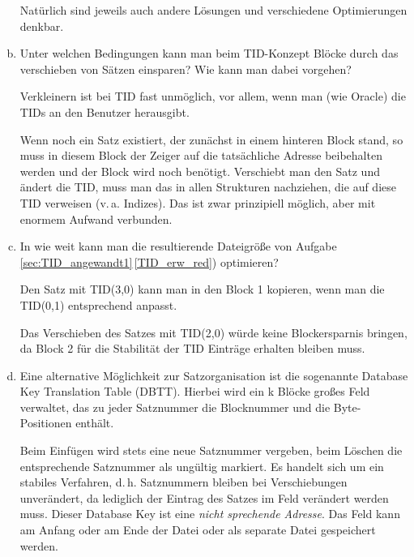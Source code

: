 \begin{enumerate}[a)]
	\begin{note}
	Natürlich sind jeweils auch andere Lösungen und verschiedene Optimierungen denkbar.
	\end{note}


	\item Unter welchen Bedingungen kann man beim TID-Konzept Blöcke durch das verschieben von Sätzen einsparen? Wie kann man dabei vorgehen?
	\label{TID_Zusammenfassen}

	\begin{solution}
	Verkleinern ist bei TID fast unmöglich, vor allem, wenn man (wie Oracle) die TIDs an den Benutzer herausgibt.

	Wenn noch ein Satz existiert, der zunächst in einem hinteren Block stand, so muss in diesem Block der Zeiger auf die tatsächliche Adresse beibehalten werden und der Block wird noch benötigt.
	Verschiebt man den Satz und ändert die TID, muss man das in allen Strukturen nachziehen, die auf diese TID verweisen (v.\,a. Indizes).
	Das ist zwar prinzipiell möglich, aber mit enormem Aufwand verbunden.
	\end{solution}

  \item In \deepen wie weit kann man die resultierende Dateigröße von Aufgabe \ref{sec:TID_angewandt1}\,\ref{TID_erw_red}) optimieren?

	\begin{note}
		Den Satz mit TID(3,0) kann man in den Block 1 kopieren, wenn man die TID(0,1) entsprechend anpasst.

		Das Verschieben des Satzes mit TID(2,0) würde keine Blockersparnis bringen, da Block 2 für die Stabilität der TID Einträge erhalten bleiben muss.
	\end{note}


	\item Eine alternative Möglichkeit zur Satzorganisation ist die sogenannte Database Key Translation Table (DBTT).
	Hierbei wird ein k Blöcke großes Feld verwaltet, das zu jeder Satznummer die Blocknummer und die Byte-Positionen enthält.

	Beim Einfügen wird stets eine neue Satznummer vergeben, beim Löschen die entsprechende Satznummer als ungültig markiert.
	Es handelt sich um ein stabiles Verfahren, d.\,h. Satznummern bleiben bei Verschiebungen unverändert, da lediglich der Eintrag des Satzes im Feld verändert werden muss.
	Dieser Database Key ist eine \emph{nicht sprechende Adresse}.	Das Feld kann am Anfang oder am Ende der Datei oder als separate Datei gespeichert werden.


\end{enumerate}

